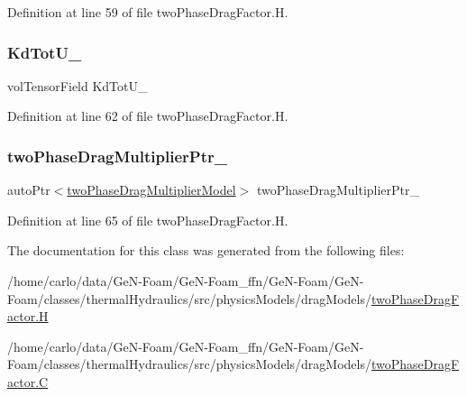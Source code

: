 Definition at line 59 of file two\+Phase\+Drag\+Factor.\+H.

\mbox{\label{classFoam_1_1twoPhaseDragFactor_a5ccb0672e7af52764436b6168f730115}} 
\subsubsection{\texorpdfstring{Kd\+Tot\+U\+\_\+}{KdTotU\_}}
{\footnotesize\ttfamily vol\+Tensor\+Field Kd\+Tot\+U\+\_\+\hspace{0.3cm}{\ttfamily [protected]}}



Definition at line 62 of file two\+Phase\+Drag\+Factor.\+H.

\mbox{\label{classFoam_1_1twoPhaseDragFactor_a744a6edf75f6e01b0e1eccb746e726cd}} 
\subsubsection{\texorpdfstring{two\+Phase\+Drag\+Multiplier\+Ptr\+\_\+}{twoPhaseDragMultiplierPtr\_}}
{\footnotesize\ttfamily auto\+Ptr$<$\hyperlink{classFoam_1_1twoPhaseDragMultiplierModel}{two\+Phase\+Drag\+Multiplier\+Model}$>$ two\+Phase\+Drag\+Multiplier\+Ptr\+\_\+\hspace{0.3cm}{\ttfamily [protected]}}



Definition at line 65 of file two\+Phase\+Drag\+Factor.\+H.



The documentation for this class was generated from the following files\+:\begin{DoxyCompactItemize}
\item 
/home/carlo/data/\+Ge\+N-\/\+Foam/\+Ge\+N-\/\+Foam\+\_\+ffn/\+Ge\+N-\/\+Foam/\+Ge\+N-\/\+Foam/classes/thermal\+Hydraulics/src/physics\+Models/drag\+Models/\hyperlink{twoPhaseDragFactor_8H}{two\+Phase\+Drag\+Factor.\+H}\item 
/home/carlo/data/\+Ge\+N-\/\+Foam/\+Ge\+N-\/\+Foam\+\_\+ffn/\+Ge\+N-\/\+Foam/\+Ge\+N-\/\+Foam/classes/thermal\+Hydraulics/src/physics\+Models/drag\+Models/\hyperlink{twoPhaseDragFactor_8C}{two\+Phase\+Drag\+Factor.\+C}\end{DoxyCompactItemize}
